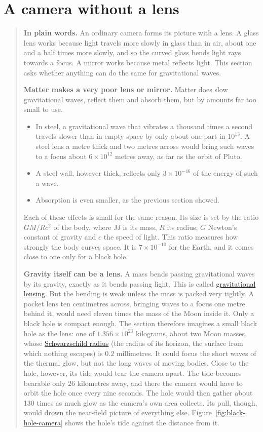 \section{A camera without a lens}\label{sec:no-lens}

\begin{quote}
\textbf{In plain words.} An ordinary camera forms its picture with a lens. A
glass lens works because light travels more slowly in glass than in air, about
one and a half times more slowly, and so the curved glass bends light rays
towards a focus. A mirror works because metal reflects light. This section asks
whether anything can do the same for gravitational waves.

\textbf{Matter makes a very poor lens or mirror.} Matter does slow
gravitational waves, reflect them and absorb them, but by amounts far too small
to use.
\begin{itemize}
\item In steel, a gravitational wave that vibrates a thousand times a second
travels slower than in empty space by only about one part in $10^{13}$. A steel lens
a metre thick and two metres across would bring such waves to a focus about
$6\times10^{12}$ metres away, as far as the orbit of Pluto.
\item A steel wall, however thick, reflects only $3\times10^{-46}$ of the energy
of such a wave.
\item Absorption is even smaller, as the previous section showed.
\end{itemize}
Each of these effects is small for the same reason. Its size is set by the
ratio $GM/Rc^2$ of the body, where $M$ is its mass, $R$ its radius, $G$
Newton's constant of gravity and $c$ the speed of light. This ratio measures
how strongly the body curves space. It is $7\times10^{-10}$ for the Earth, and
it comes close to one only for a black hole.

\textbf{Gravity itself can be a lens.} A mass bends passing gravitational waves
by its gravity, exactly as it bends passing light. This is called
\href{https://en.wikipedia.org/wiki/Gravitational_lens}{gravitational lensing}.
But the bending is weak unless the mass is packed very tightly. A pocket lens
ten centimetres across, bringing waves to a focus one metre behind it, would
need eleven times the mass of the Moon inside it. Only a black hole is compact
enough. The section therefore imagines a small black hole as the lens: one of
$1.356\times10^{23}$ kilograms, about two Moon masses, whose
\href{https://en.wikipedia.org/wiki/Schwarzschild_radius}{Schwarzschild
radius} (the radius of its horizon, the surface from which nothing escapes) is
$0.2$ millimetres. It could focus the short waves of the thermal glow, but not
the long waves of moving bodies. Close to the hole, however, its tide would
tear the camera apart. The tide becomes bearable only $26$ kilometres away, and
there the camera would have to orbit the hole once every nine seconds. The
hole would then gather about 130 times as much glow as the camera's own area
collects. Its pull, though, would drown the near-field picture of everything
else. Figure~\ref{fig:black-hole-camera} shows the hole's tide against the distance from it.


\end{quote}
